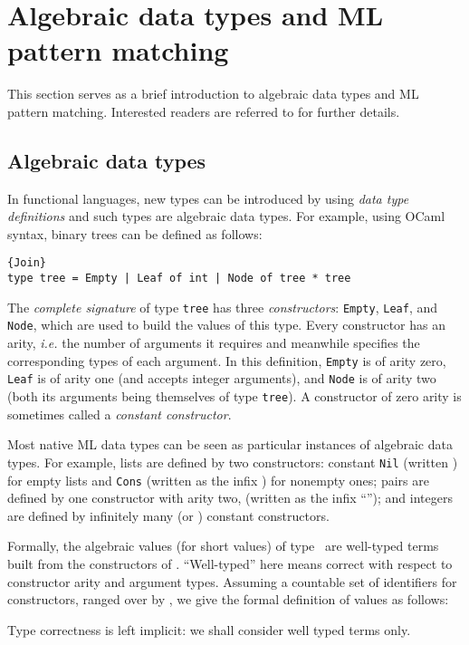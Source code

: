 \documentclass{LMCS}
\makeatletter
\let \lst \lstinline
\newcommand{\ie}{\emph{i.e.}\@\xspace}
\newcommand{\ocaml}{\textrm{OCaml}\xspace}
\renewcommand{\_}{\mathord{\rule[-.25ex]{1ex}{.15ex}}}
\makeatother
\begin{document}
\section{Algebraic data types and ML pattern matching}
\label{sec.pt}

This section serves as a brief introduction to algebraic data types
and ML pattern matching. Interested readers are referred to
\cite{warning,LefessantMarangetPattern} for further details.

\subsection{Algebraic data types}
\label{subsec.pt}

In functional languages, new types can be introduced by using
\emph{data type definitions} and such types are algebraic
data types.
For example, using \ocaml syntax, binary trees can be defined as follows:
\begin{lstlisting}{Join}
type tree = Empty | Leaf of int | Node of tree * tree
\end{lstlisting}
The \emph{complete signature} of type \lst"tree" has three
\emph{constructors}: \lst"Empty", \lst"Leaf", and \lst"Node", which
are used to build the values of this type. Every constructor has an
arity, \ie the number of arguments it requires and meanwhile specifies
the corresponding types of each argument. In this definition,
\lst"Empty" is of arity zero, \lst"Leaf" is of arity one (and accepts
integer arguments),
and \lst"Node" is of arity two (both its arguments being themselves of
type \lst"tree"). A constructor of zero arity is sometimes called a
\emph{constant constructor}.

Most native ML data types can be seen as particular instances of
algebraic data types. For example, lists are defined by two
constructors: constant \lst"Nil" (written ) for empty
lists and \lst"Cons" (written as the infix ) for
nonempty ones; pairs are defined by one constructor with arity two,
(written as the infix ``''); and integers
are defined by infinitely many (or ) constant constructors.


Formally, the algebraic values (for short values) of type~ are well-typed terms built from the constructors of .
``Well-typed'' here means correct with respect to constructor arity
and argument types.
Assuming a countable set of identifiers for constructors,
ranged over by , we give the formal definition of values as
follows:

Type correctness is left implicit: we shall consider well typed terms
only.
\end{document}
